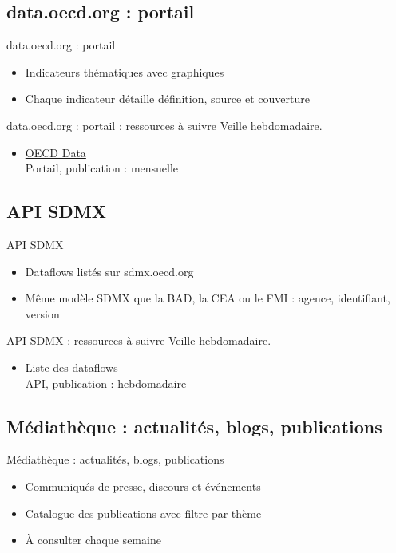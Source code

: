 \documentclass[aspectratio=169,11pt]{beamer}
\begin{document}
\subsection{data.oecd.org : portail}
\begin{frame}{data.oecd.org : portail}
\begin{itemize}
\item Indicateurs thématiques avec graphiques
\item Chaque indicateur détaille définition, source et couverture
\end{itemize}
\end{frame}

\begin{frame}{data.oecd.org : portail : ressources à suivre}
\small
Veille hebdomadaire.
\begin{itemize}
\item \href{https://data.oecd.org}{OECD Data}\\{\footnotesize Portail, publication : mensuelle}
\end{itemize}
\end{frame}

\subsection{API SDMX}
\begin{frame}{API SDMX}
\begin{itemize}
\item Dataflows listés sur sdmx.oecd.org
\item Même modèle SDMX que la BAD, la CEA ou le FMI : agence, identifiant, version
\end{itemize}
\end{frame}

\begin{frame}{API SDMX : ressources à suivre}
\small
Veille hebdomadaire.
\begin{itemize}
\item \href{https://sdmx.oecd.org/public/rest/dataflow}{Liste des dataflows}\\{\footnotesize API, publication : hebdomadaire}
\end{itemize}
\end{frame}

\subsection{Médiathèque : actualités, blogs, publications}
\begin{frame}{Médiathèque : actualités, blogs, publications}
\begin{itemize}
\item Communiqués de presse, discours et événements
\item Catalogue des publications avec filtre par thème
\item À consulter chaque semaine
\end{itemize}
\end{frame}
\end{document}
